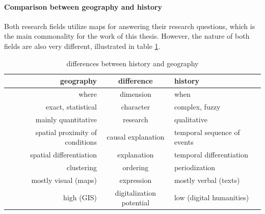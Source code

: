 

\paragraph{Comparison between geography and history} %
\label{par:comparison_of_geography_and_history}

Both research fields utilize maps for answering their research questions, which is the main commonality for the work of this thesis. However, the nature of both fields are also very different, illustrated in table \ref{tab:history_vs_geography}.

\begin{table}[ht]
\begin{center}
\begin{tabular}{p{0px} r c l p{0px}}
    \toprule
    & geography
    & difference
    & history
    & \\
    \midrule
    & where
    & dimension
    & when
    & \\

    & exact, statistical
    & character
    & complex, fuzzy
    & \\

    & mainly quantitative
    & research
    & qualitative
    & \\

    & spatial proximity of conditions
    & causal explanation
    & temporal sequence of events
    & \\

    & spatial differentiation
    & explanation
    & temporal differentiation
    & \\

    & clustering
    & ordering
    & periodization
    & \\

    & mostly visual (maps)
    & expression
    & mostly verbal (texts)
    & \\

    & high (GIS)
    & digitalization potential
    & low (digital humanities)
    & \\
    \bottomrule
\end{tabular}
\caption{differences between history and geography \cite[pp. 2-4]{knowles2008placing}}
\label{tab:history_vs_geography}
\end{center}
\end{table}


